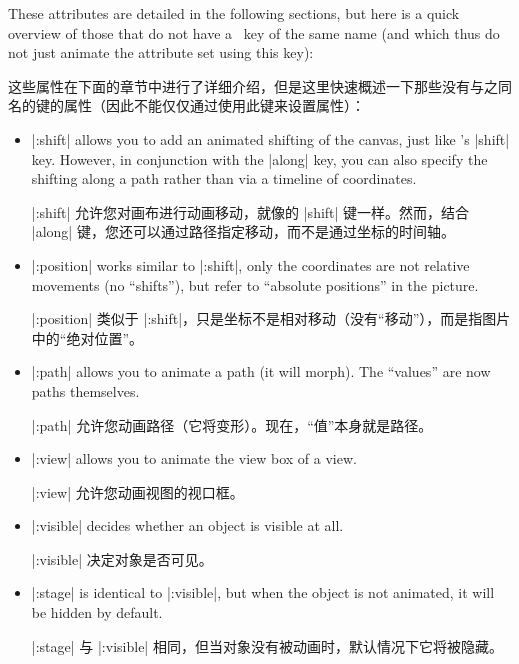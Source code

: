 These attributes are detailed in the following sections, but here is a quick
overview of those that do not have a \tikzname\ key of the same name (and which
thus do not just animate the attribute set using this key):

这些属性在下面的章节中进行了详细介绍，但是这里快速概述一下那些没有与之同名的\tikzname 键的属性（因此不能仅仅通过使用此键来设置属性）：


\begin{itemize}
    \item |:shift| allows you to add an animated shifting of the canvas, just
        like \tikzname's |shift| key. However, in conjunction with the |along|
        key, you can also specify the shifting along a path rather than via a
        timeline of coordinates.

        |:shift| 允许您对画布进行动画移动，就像\tikzname 的 |shift| 键一样。然而，结合 |along| 键，您还可以通过路径指定移动，而不是通过坐标的时间轴。


    \item |:position| works similar to |:shift|, only the coordinates are not
        relative movements (no ``shifts''), but refer to ``absolute positions''
        in the picture.

        |:position| 类似于 |:shift|，只是坐标不是相对移动（没有“移动”），而是指图片中的“绝对位置”。


    \item |:path| allows you to animate a path (it will morph). The ``values''
        are now paths themselves.

        |:path| 允许您动画路径（它将变形）。现在，“值”本身就是路径。


    \item |:view| allows you to animate the view box of a view.

    |:view| 允许您动画视图的视口框。


    \item |:visible| decides whether  an object is visible at all.

    |:visible| 决定对象是否可见。


    \item |:stage| is identical to |:visible|, but when the object is not
        animated, it will be hidden by default.

        |:stage| 与 |:visible| 相同，但当对象没有被动画时，默认情况下它将被隐藏。


\end{itemize}


